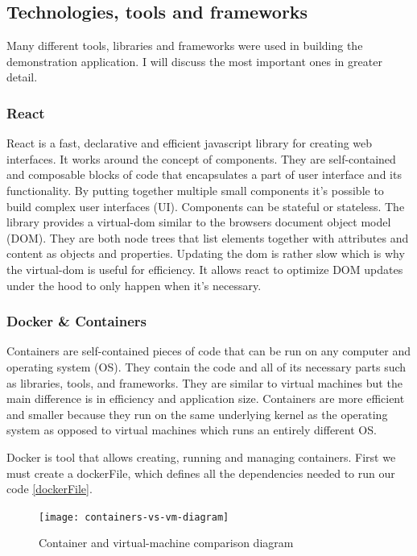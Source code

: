 \subsection{Technologies, tools and frameworks}
Many different tools, libraries and frameworks were used in building the demonstration application. I will discuss the most important ones in greater detail.
\subsubsection{React}
React is a fast, declarative and efficient javascript library for creating web interfaces. It works around the concept of components. They are self-contained and composable blocks of code that encapsulates a part of user interface and its functionality. By putting together multiple small components it's possible to build complex user interfaces (UI). Components can be stateful or stateless.
The library provides a virtual-dom similar to the browsers document object model (DOM). They are both node trees that list elements together with attributes and content as objects and properties. Updating the dom is rather slow which is why the virtual-dom is useful for efficiency. It allows react to optimize DOM updates under the hood to only happen when it's necessary.

\subsubsection{Docker \& Containers}
Containers are self-contained pieces of code that can be run on any computer and operating system (OS). They contain the code and all of its necessary parts such as libraries, tools, and frameworks. They are similar to virtual machines but the main difference is in efficiency and application size. Containers are more efficient and smaller because they run on the same underlying kernel as the operating system as opposed to virtual machines which runs an entirely different OS.

Docker is tool that allows creating, running and managing containers. First we must create a dockerFile, which defines all the dependencies needed to run our code \ref{dockerFile}.

\begin{figure}[h!]
    \texttt{[image: containers-vs-vm-diagram]}
    \caption{Container and virtual-machine comparison diagram}
\end{figure}

